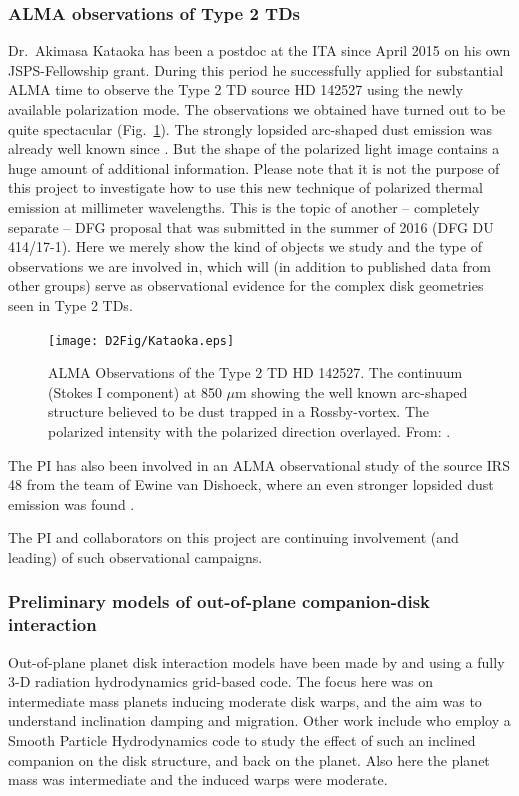 \documentclass[10pt,fleqn,twoside]{article}
\begin{document}
\subsubsection{ALMA observations of Type 2 TDs}
Dr.~Akimasa Kataoka has been a postdoc at the ITA since April 2015 on his
own JSPS-Fellowship grant. During this period he successfully applied for
substantial ALMA time to observe the Type 2 TD source HD 142527 using the
newly available polarization mode. The observations we obtained have turned
out to be quite spectacular (Fig.~\ref{fig-kataoka}). The strongly lopsided
arc-shaped dust emission was already well known since
\citep{2013Natur.493..191C}. But the shape of the polarized light image
contains a huge amount of additional information. Please note that it is not
the purpose of this project to investigate how to use this new technique of
polarized thermal emission at millimeter wavelengths. This is the topic of
another -- completely separate -- DFG proposal that was submitted in the
summer of 2016 (DFG DU 414/17-1). Here we merely show the kind of objects we
study and the type of observations we are involved in, which will (in
addition to published data from other groups) serve as observational
evidence for the complex disk geometries seen in Type 2 TDs.

\begin{figure}
\centerline{\texttt{[image: D2Fig/Kataoka.eps]}}
\caption{\label{fig-kataoka} ALMA Observations of the Type 2 TD HD 142527.
   The continuum (Stokes I component) at 850 $\mu$m
  showing the well known arc-shaped structure believed to be dust trapped in
  a Rossby-vortex.   The polarized intensity with the
  polarized direction overlayed.  From: \citet{2016ApJ...831L..12K}.}
\end{figure}

The PI has also been involved in an ALMA observational study of the source
IRS 48 from the team of Ewine van Dishoeck, where an even stronger lopsided
dust emission was found \citep{2013Sci...340.1199V}. 

The PI and collaborators on this project are continuing involvement (and
leading) of such observational campaigns.


\subsubsection{Preliminary models of out-of-plane companion-disk interaction}
Out-of-plane planet disk interaction models have been made by
\citet{2011A&A...530A..41B} and \citet{2013A&A...555A.124B} using a fully
3-D radiation hydrodynamics grid-based code. 
The focus here was on intermediate mass planets inducing moderate
disk warps, and the aim was to understand inclination damping and
migration. Other work include \citet{2013MNRAS.431.1320X} who employ
a Smooth Particle Hydrodynamics code to study the effect of such an
inclined companion on the disk structure, and back on the planet. Also
here the planet mass was intermediate and the induced warps were moderate.
 
\end{document}
